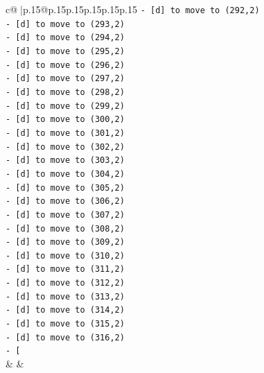 \documentclass{article}
\begin{document}
{\begin{supertabular}{c@{$\;$}|p{.15\linewidth}@{}p{.15\linewidth}p{.15\linewidth}p{.15\linewidth}p{.15\linewidth}p{.15\linewidth}}
{{{\texttt{{-} {[}d{]} to move to (292,2)} \\
\texttt{{-} {[}d{]} to move to (293,2)} \\
\texttt{{-} {[}d{]} to move to (294,2)} \\
\texttt{{-} {[}d{]} to move to (295,2)} \\
\texttt{{-} {[}d{]} to move to (296,2)} \\
\texttt{{-} {[}d{]} to move to (297,2)} \\
\texttt{{-} {[}d{]} to move to (298,2)} \\
\texttt{{-} {[}d{]} to move to (299,2)} \\
\texttt{{-} {[}d{]} to move to (300,2)} \\
\texttt{{-} {[}d{]} to move to (301,2)} \\
\texttt{{-} {[}d{]} to move to (302,2)} \\
\texttt{{-} {[}d{]} to move to (303,2)} \\
\texttt{{-} {[}d{]} to move to (304,2)} \\
\texttt{{-} {[}d{]} to move to (305,2)} \\
\texttt{{-} {[}d{]} to move to (306,2)} \\
\texttt{{-} {[}d{]} to move to (307,2)} \\
\texttt{{-} {[}d{]} to move to (308,2)} \\
\texttt{{-} {[}d{]} to move to (309,2)} \\
\texttt{{-} {[}d{]} to move to (310,2)} \\
\texttt{{-} {[}d{]} to move to (311,2)} \\
\texttt{{-} {[}d{]} to move to (312,2)} \\
\texttt{{-} {[}d{]} to move to (313,2)} \\
\texttt{{-} {[}d{]} to move to (314,2)} \\
\texttt{{-} {[}d{]} to move to (315,2)} \\
\texttt{{-} {[}d{]} to move to (316,2)} \\
\texttt{{-} {[}} \\
            }
        }
    }
    & & \\ \\


\end{supertabular}}
\end{document}
